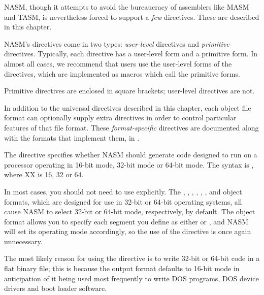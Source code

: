 %
%

NASM, though it attempts to avoid the bureaucracy of assemblers like
MASM and TASM, is nevertheless forced to support a \emph{few}
directives. These are described in this chapter.

NASM's directives come in two types: 
\emph{user-level} directives and 
\emph{primitive} directives. Typically, each directive has a
user-level form and a primitive form. In almost all cases, we
recommend that users use the user-level forms of the directives,
which are implemented as macros which call the primitive forms.

Primitive directives are enclosed in square brackets; user-level
directives are not.

In addition to the universal directives described in this chapter,
each object file format can optionally supply extra directives in
order to control particular features of that file format. These
\emph{format-specific} directives are
documented along with the formats that implement them, in
.


The  directive specifies whether NASM should generate code
designed to run on a processor
operating in 16-bit mode, 32-bit mode or 64-bit mode. The syntax is
, where XX is 16, 32 or 64.

In most cases, you should not need to use  explicitly. The
, , , , ,
,  and  object formats, which
are designed for use in 32-bit or 64-bit operating systems, all cause
NASM to select 32-bit or 64-bit mode, respectively, by default.
The  object format allows you to specify each segment
you define as either  or , and NASM will
set its operating mode accordingly, so the use of the 
directive is once again unnecessary.

The most likely reason for using the  directive is to write
32-bit or 64-bit code in a flat binary file; this is because the 
output format defaults to 16-bit mode in anticipation of it being
used most frequently to write DOS  programs, DOS 
device drivers and boot loader software.

